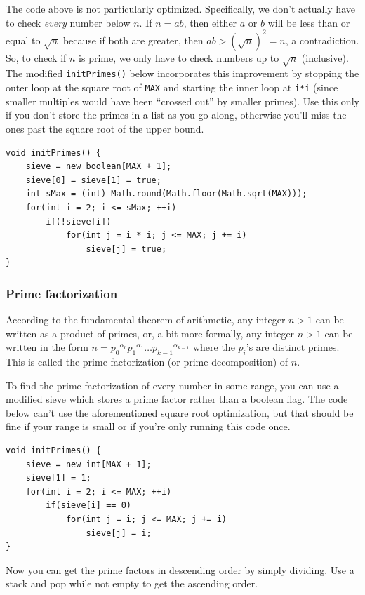 \documentclass[a4paper,12pt]{article}
\begin{document}
The code above is not particularly optimized. Specifically, we don't actually have to check {\em every} number below $n$. If $n=ab$, then either $a$ or $b$ will be less than or equal to $\sqrt{n}$ because if both are greater, then $ab>\left(\sqrt{n}\right)^2=n$, a contradiction. So, to check if $n$ is prime, we only have to check numbers up to $\sqrt{n}$ (inclusive). The modified \lstinline/initPrimes()/ below incorporates this improvement by stopping the outer loop at the square root of \lstinline/MAX/ and starting the inner loop at \lstinline/i*i/ (since smaller multiples would have been ``crossed out'' by smaller primes). Use this only if you don't store the primes in a list as you go along, otherwise you'll miss the ones past the square root of the upper bound.

\begin{lstlisting}
void initPrimes() {
	sieve = new boolean[MAX + 1];
	sieve[0] = sieve[1] = true;
	int sMax = (int) Math.round(Math.floor(Math.sqrt(MAX)));
	for(int i = 2; i <= sMax; ++i)
		if(!sieve[i])
			for(int j = i * i; j <= MAX; j += i)
				sieve[j] = true;
}
\end{lstlisting}

\subsubsection{Prime factorization}

According to the fundamental theorem of arithmetic, any integer $n>1$ can be written as a product of primes, or, a bit more formally, any integer $n>1$ can be written in the form $n={p_0}^{\alpha_0}{p_1}^{\alpha_1}\ldots{p_{k-1}}^{\alpha_{k-1}}$ where the $p_i$'s are distinct primes. This is called the prime factorization (or prime decomposition) of $n$.

To find the prime factorization of every number in some range, you can use a modified sieve which stores a prime factor rather than a boolean flag. The code below can't use the aforementioned square root optimization, but that should be fine if your range is small or if you're only running this code once.

\begin{lstlisting}
void initPrimes() {
	sieve = new int[MAX + 1];
	sieve[1] = 1;
	for(int i = 2; i <= MAX; ++i)
		if(sieve[i] == 0)
			for(int j = i; j <= MAX; j += i)
				sieve[j] = i;
}
\end{lstlisting}

\noindent Now you can get the prime factors in descending order by simply dividing. Use a stack and pop while not empty to get the ascending order.
\end{document}
